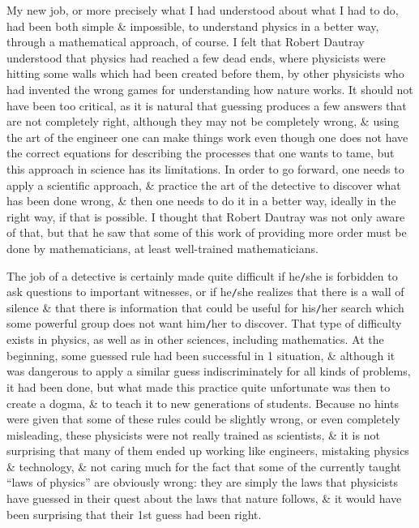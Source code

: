 \documentclass{article}
\begin{document}
\begin{enumerate}
	My new job, or more precisely what I had understood about what I had to do, had been both simple \& impossible, to understand physics in a better way, through a mathematical approach, of course. I felt that {\sc Robert Dautray} understood that physics had reached a few dead ends, where physicists were hitting some walls which had been created before them, by other physicists who had invented the wrong games for understanding how nature works. It should not have been too critical, as it is natural that guessing produces a few answers that are not completely right, although they may not be completely wrong, \& using the art of the engineer one can make things work even though one does not have the correct equations for describing the processes that one wants to tame, but this approach in science has its limitations. In order to go forward, one needs to apply a scientific approach, \& practice the art of the detective to discover what has been done wrong, \& then one needs to do it in a better way, ideally in the right way, if that is possible. I thought that {\sc Robert Dautray} was not only aware of that, but that he saw that some of this work of providing more order must be done by mathematicians, at least well-trained mathematicians.
	
	The job of a detective is certainly made quite difficult if he{\tt/}she is forbidden to ask questions to important witnesses, or if he{\tt/}she realizes that there is a wall of silence \& that there is information that could be useful for his{\tt/}her search which some powerful group does not want him{\tt/}her to discover. That type of difficulty exists in physics, as well as in other sciences, including mathematics. At the beginning, some guessed rule had been successful in 1 situation, \& although it was dangerous to apply a similar guess indiscriminately for all kinds of problems, it had been done, but what made this practice quite unfortunate was then to create a dogma, \& to teach it to new generations of students. Because no hints were given that some of these rules could be slightly wrong, or even completely misleading, these physicists were not really trained as scientists, \& it is not surprising that many of them ended up working like engineers, mistaking physics \& technology, \& not caring much for the fact that some of the currently taught ``laws of physics'' are obviously wrong: they are simply the laws that physicists have guessed in their quest about the laws that nature follows, \& it would have been surprising that their 1st guess had been right.
	

\end{enumerate}
\end{document}
